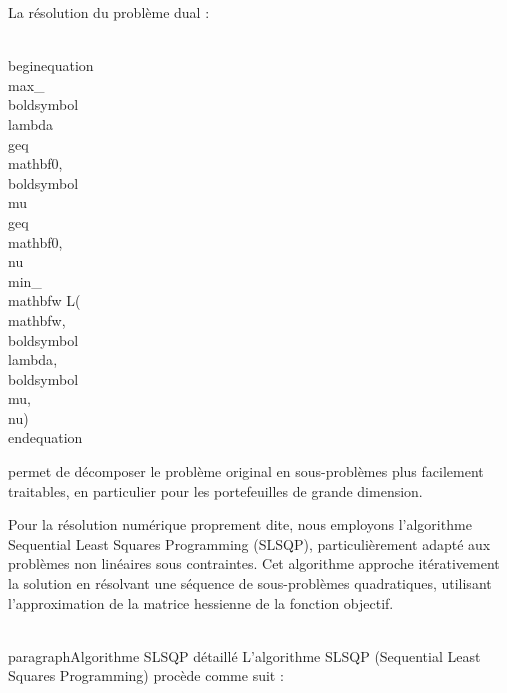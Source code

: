 La résolution du problème dual :

\\begin{equation}
\\max_{\\boldsymbol{\\lambda} \\geq \\mathbf{0}, \\boldsymbol{\\mu} \\geq \\mathbf{0}, \\nu} \\min_{\\mathbf{w}} L(\\mathbf{w}, \\boldsymbol{\\lambda}, \\boldsymbol{\\mu}, \\nu)
\\end{equation}

permet de décomposer le problème original en sous-problèmes plus facilement traitables, en particulier pour les portefeuilles de grande dimension.

Pour la résolution numérique proprement dite, nous employons l'algorithme Sequential Least Squares Programming (SLSQP), particulièrement adapté aux problèmes non linéaires sous contraintes. Cet algorithme approche itérativement la solution en résolvant une séquence de sous-problèmes quadratiques, utilisant l'approximation de la matrice hessienne de la fonction objectif.

\\paragraph{Algorithme SLSQP détaillé}
L'algorithme SLSQP (Sequential Least Squares Programming) procède comme suit :

